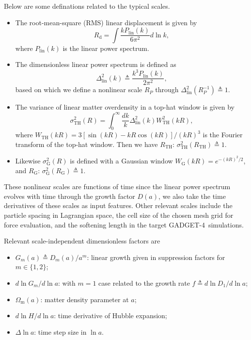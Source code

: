 \documentclass[modern, trackchanges, dvipsnames]{aastex631}
\newcommand{\GADGET}{{{\fontsize{10pt}{12pt}\selectfont GADGET}-4}}
\renewcommand{\d}{d}
\newcommand{\lna}{\ln\!a}
\newcommand{\lnk}{\ln\!k}
\newcommand{\Omegam}{\Omega_\mathrm{m}}
\newcommand{\linear}{\mathrm{lin}}
\newcommand{\tophat}{\mathrm{TH}}
\newcommand{\gauss}{\mathrm{G}}
\begin{document}
Below are some definations related to the typical scales.
\begin{itemize}
\item The root-mean-square (RMS) linear displacement is given by
%
\begin{equation}
R_\mathrm{d} = \int \frac{k P_\linear(k)}{6\pi^2} \d\lnk,
\end{equation}
%
where $P_\linear(k)$ is the linear power spectrum.
\item The dimensionless linear power spectrum is defined as
%
\begin{equation}
\Delta^2_\linear(k) \triangleq \frac{k^3 P_\linear(k)}{2 \pi^2},
\end{equation}
%
based on which we define a nonlinear scale $R_P$ through
$\Delta_\linear^2(R_P^{-1}) \triangleq 1$.
\item The variance of linear matter overdensity in a top-hat window is given by
%
\begin{equation}
\sigma_\tophat^2(R) = \int_0^\infty \frac{\d k}k
  \Delta_\linear^2(k) W_\tophat^2(kR),
\end{equation}
%
where $W_\tophat(kR) = 3[\sin(kR) - kR\cos(kR)] / (kR)^3$ is the
Fourier transform of the top-hat window.
Then we have $R_\tophat$: $\sigma_\tophat^2(R_\tophat) \triangleq 1$.
\item Likewise $\sigma_\gauss^2(R)$ is defined with a Gaussian window
$W_\gauss(kR) = e^{-(kR)^2/2}$, and $R_\gauss$: $\sigma_\gauss^2(R_\gauss)
\triangleq 1$.
\end{itemize}
These nonlinear scales are functions of time since the linear power
spectrum evolves with time through the growth factor $D(a)$, we also
take the time derivatives of these scales as input features.
Other relevant scales include the particle spacing in Lagrangian space,
the cell size of the chosen mesh grid for force evaluation, and the
softening length in the target \GADGET\ simulations.

Relevant scale-independent dimensionless factors are
\begin{itemize}
\item $G_m(a) \triangleq D_m(a) / a^m$: linear growth given in
  suppression factors for $m \in \{1, 2\}$;
\item $\d\ln G_m / \d\lna$: with $m=1$ case related to the growth rate
  $f \triangleq \d\ln D_1 / \d\lna$;
\item $\Omegam(a)$: matter density parameter at $a$;
\item $\d\ln\!H / \d\lna$: time derivative of Hubble expansion;
\item $\Delta\lna$: time step size in $\lna$.
\end{itemize}
\end{document}
